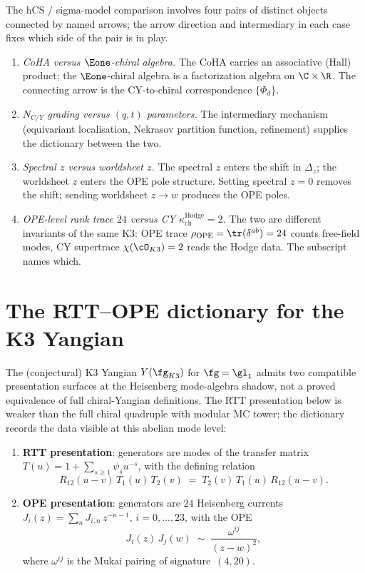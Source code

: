 \begin{remark}
\label{rem:hcs-sigma-conflations}
The hCS / sigma-model comparison involves four pairs of distinct objects connected by named arrows; the arrow direction and intermediary in each case fixes which side of the pair is in play.
\begin{enumerate}[label=(\alph*)]
 \item \emph{CoHA versus $\Eone$-chiral algebra.} The CoHA carries an associative (Hall) product; the $\Eone$-chiral algebra is a factorization algebra on $\C \times \R$. The connecting arrow is the CY-to-chiral correspondence $\{\Phi_d\}$.
 \item \emph{$N_{C/Y}$ grading versus $(q,t)$ parameters.} The intermediary mechanism (equivariant localisation, Nekrasov partition function, refinement) supplies the dictionary between the two.
 \item \emph{Spectral $z$ versus worldsheet $z$.} The spectral $z$ enters the shift in $\Delta_z$; the worldsheet $z$ enters the OPE pole structure. Setting spectral $z = 0$ removes the shift; sending worldsheet $z \to w$ produces the OPE poles.
 \item \emph{OPE-level rank trace $24$ versus CY $\kappa_{\mathrm{ch}}^{\mathrm{Hodge}} = 2$.} The two are different invariants of the same K3: OPE trace $\rho_{\mathrm{OPE}}=\tr(\delta^{ab}) = 24$ counts free-field modes, CY supertrace $\chi(\cO_{K3}) = 2$ reads the Hodge data. The subscript names which.
\end{enumerate}
\end{remark}


\section{The RTT--OPE dictionary for the K3 Yangian}
\label{sec:rtt-ope-dictionary}

The (conjectural) K3 Yangian $Y(\fg_{K3})$ for $\fg = \gl_1$ admits two
compatible presentation surfaces at the Heisenberg mode-algebra shadow,
not a proved equivalence of full chiral-Yangian definitions. The RTT
presentation below is weaker than the full chiral quadruple with modular
MC tower; the dictionary records the data visible at this abelian mode
level:
\begin{enumerate}[label=(\Alph*)]
 \item \textbf{RTT presentation}: generators are modes of the transfer matrix $T(u) = 1 + \sum_{s \geq 1} \psi_s u^{-s}$, with the defining relation
 \[
 R_{12}(u - v)\, T_1(u)\, T_2(v) \;=\; T_2(v)\, T_1(u)\, R_{12}(u - v).
 \]
 \item \textbf{OPE presentation}: generators are $24$ Heisenberg currents $J_i(z) = \sum_n J_{i,n}\, z^{-n-1}$, $i = 0, \ldots, 23$, with the OPE
 \[
 J_i(z)\, J_j(w) \;\sim\; \frac{\omega^{ij}}{(z - w)^2},
 \]
 where $\omega^{ij}$ is the Mukai pairing of signature~$(4, 20)$.
\end{enumerate}


